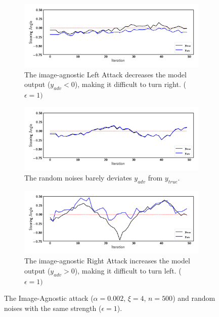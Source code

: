 \clearpage

\null
\vfill

\begin{figure}[H]
    \centering
    \begin{subfigure}[b]{\textwidth}
        \includegraphics[width=\textwidth]{figures/chapter_driving/uni_left.png}
        \caption{The image-agnostic Left Attack decreases the model output ($y_{adv}<0$), making it difficult to turn right. ($\epsilon=1)$}
        \label{fig:uni_left}
    \end{subfigure}
    \begin{subfigure}[b]{\textwidth}
        \includegraphics[width=\textwidth]{figures/chapter_driving/uni_random.png}
        \caption{The random noises barely deviates $y_{adv}$ from $y_{true}$.}
        \label{fig:uni_random}
    \end{subfigure}
    \begin{subfigure}[b]{\textwidth}
        \includegraphics[width=\textwidth]{figures/chapter_driving/uni_right.png}
        \caption{The image-agnostic Right Attack increases the model output ($y_{adv}>0$), making it difficult to turn left. ($\epsilon=1)$}
        \label{fig:uni_right}
    \end{subfigure}
    \caption{The Image-Agnostic attack ($\alpha=0.002$, $\xi=4$, $n=500$) and random noises with the same strength ($\epsilon = 1$).}
    \label{fig:image-agnostic-online}
\end{figure}

